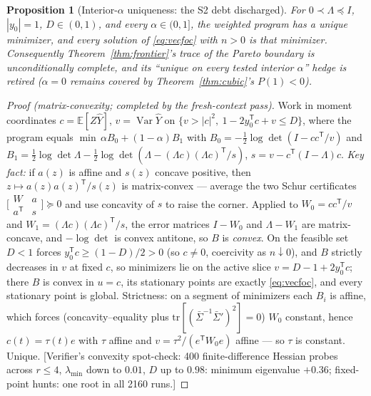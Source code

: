 \documentclass[11pt]{article}
\newtheorem{proposition}{Proposition}
\newcommand{\E}{\mathbb{E}}\newcommand{\tr}{\operatorname{tr}}
\newcommand{\hY}{\widehat Y}
\begin{document}
\begin{proposition}[Interior-$\alpha$ uniqueness: the S2 debt discharged]
\label{rem:uniq}
For $0\prec\Lambda\preceq I$, $|y_0|=1$, $D\in(0,1)$, and every
$\alpha\in(0,1]$, the weighted program has a \emph{unique} minimizer, and
every solution of \eqref{eq:vecfoc} with $n>0$ is that minimizer.
Consequently Theorem~\ref{thm:frontier}'s trace of the Pareto boundary is
unconditionally complete, and its ``unique on every tested interior
$\alpha$'' hedge is retired ($\alpha=0$ remains covered by
Theorem~\ref{thm:cubic}'s $P(1)<0$).
\end{proposition}
\begin{proof}[Proof (matrix-convexity; completed by the fresh-context
pass)]
Work in moment coordinates $c=\E[Z\hY]$, $v=\operatorname{Var}\hY$ on
$\{v>|c|^2,\ 1-2y_0^{\mathsf T}c+v\le D\}$, where the program equals
$\min\,\alpha B_0+(1-\alpha)B_1$ with
$B_0=-\tfrac12\log\det(I-cc^{\mathsf T}/v)$ and
$B_1=\tfrac12\log\det\Lambda-\tfrac12\log\det(\Lambda-(\Lambda c)
(\Lambda c)^{\mathsf T}/s)$, $s=v-c^{\mathsf T}(I-\Lambda)c$.
\emph{Key fact:} if $a(z)$ is affine and $s(z)$ concave positive, then
$z\mapsto a(z)a(z)^{\mathsf T}/s(z)$ is matrix-convex --- average the two
Schur certificates $\bigl[\begin{smallmatrix}W&a\\a^{\mathsf T}&s
\end{smallmatrix}\bigr]\succeq0$ and use concavity of $s$ to raise the
corner. Applied to $W_0=cc^{\mathsf T}/v$ and
$W_1=(\Lambda c)(\Lambda c)^{\mathsf T}/s$, the error matrices
$I-W_0$ and $\Lambda-W_1$ are matrix-concave, and $-\log\det$ is convex
antitone, so $B$ is \emph{convex}. On the feasible set $D<1$ forces
$y_0^{\mathsf T}c\ge(1-D)/2>0$ (so $c\ne0$, coercivity as $n\downarrow0$),
and $B$ strictly decreases in $v$ at fixed $c$, so minimizers lie on the
active slice $v=D-1+2y_0^{\mathsf T}c$; there $B$ is convex in $u=c$, its
stationary points are exactly \eqref{eq:vecfoc}, and every stationary
point is global. Strictness: on a segment of minimizers each $B_i$ is
affine, which forces (concavity--equality plus
$\mathrm{tr}[(\bar\Sigma^{-1}\bar\Sigma')^2]=0$) $W_0$ constant, hence
$c(t)=\tau(t)e$ with $\tau$ affine and $v=\tau^2/(e^{\mathsf T}W_0e)$
affine --- so $\tau$ is constant. Unique. [Verifier's convexity
spot-check: 400 finite-difference Hessian probes across
$r\le4$, $\lambda_{\min}$ down to $0.01$, $D$ up to $0.98$: minimum
eigenvalue $+0.36$; fixed-point hunts: one root in all 2160 runs.]
\end{proof}
\end{document}
